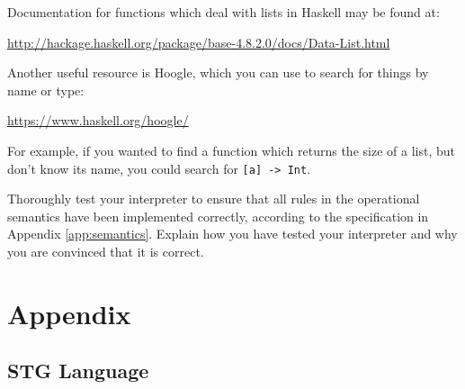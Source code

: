 \documentclass[10pt,a4paper]{exam} %
\begin{document}
\begin{questions}
\begin{mdframed}
Documentation for functions which deal with lists in Haskell may be found at:

\url{http://hackage.haskell.org/package/base-4.8.2.0/docs/Data-List.html}

Another useful resource is Hoogle, which you can use to search for things by name or type:

\url{https://www.haskell.org/hoogle/}

For example, if you wanted to find a function which returns the size of a list, but don't know its name, you could search for \texttt{[a] -> Int}.

\end{mdframed}

\question Thoroughly test your interpreter to ensure that all rules in the operational semantics have been implemented correctly, according to the specification in Appendix \ref{app:semantics}. Explain how you have tested your interpreter and why you are convinced that it is correct.
\end{questions}

\newpage
\appendix
\section{Appendix}

\subsection{STG Language}
\end{document}
